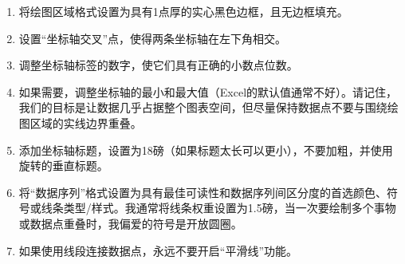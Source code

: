 \begin{enumerate}
\item 将绘图区域格式设置为具有1点厚的实心黑色边框，且无边框填充。

\item 设置“坐标轴交叉”点，使得两条坐标轴在左下角相交。

\item 调整坐标轴标签的数字，使它们具有正确的小数点位数。

\item 如果需要，调整坐标轴的最小和最大值（Excel的默认值通常不好）。请记住，我们的目标是让数据几乎占据整个图表空间，但尽量保持数据点不要与围绕绘图区域的实线边界重叠。

\item 添加坐标轴标题，设置为18磅（如果标题太长可以更小），不要加粗，并使用旋转的垂直标题。

\item 将“数据序列”格式设置为具有最佳可读性和数据序列间区分度的首选颜色、符号或线条类型/样式。我通常将线条权重设置为1.5磅，当一次要绘制多个事物或数据点重叠时，我偏爱的符号是开放圆圈。

\item 如果使用线段连接数据点，永远不要开启“平滑线”功能。


\end{enumerate}
